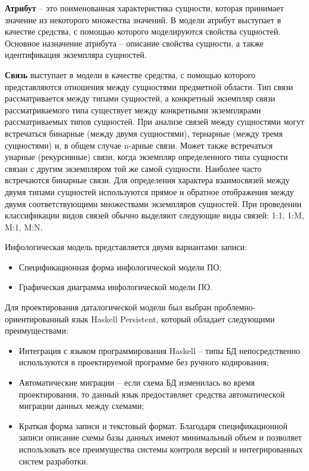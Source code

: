 \textbf{Атрибут} -- это поименованная характеристика сущности, которая принимает значение из некоторого множества значений. В модели атрибут выступает в качестве средства, с помощью которого моделируются свойства сущностей. Основное назначение атрибута – описание свойства сущности, а также идентификация экземпляра сущностей.

\textbf{Связь} выступает в модели в качестве средства, с помощью которого представляются отношения между сущностями предметной области. Тип связи рассматривается между типами сущностей, а конкретный экземпляр связи рассматриваемого типа существует между конкретными экземплярами рассматриваемых типов сущностей. При анализе связей между сущностями могут встречаться бинарные (между двумя сущностями), тернарные (между тремя сущностями) и, в общем случае n-арные связи. Может также встречаться унарные (рекурсивные) связи, когда экземпляр определенного типа сущности связан с другим экземпляром той же самой сущности. Наиболее часто встречаются бинарные связи. Для определения характера взаимосвязей между двумя типами сущностей используются прямое и обратное отображения между двумя соответствующими множествами экземпляров сущностей. При проведении классификации видов связей обычно выделяют следующие виды связей: 1:1, 1:M, M:1, M:N.

Инфологическая модель представляется двумя вариантами записи:
\begin{itemize}
\item Спецификационная форма инфологической модели ПО;
\item Графическая диаграмма инфологической модели ПО.
\end{itemize}

Для проектирования даталогической модели был выбран проблемно-ориентированный язык Haskell Persistent, который обладает следующими преимуществами:
\begin{itemize}
\item Интеграция с языком программирования Haskell -- типы БД непосредственно используются в проектируемой программе без ручного кодирования;
\item Автоматические миграции -- если схема БД изменилась во время проектирования, то данный язык предоставляет средства автоматической миграции данных между схемами;
\item Краткая форма записи и текстовый формат. Благодаря спецификационной записи описание схемы базы данных имеют минимальный объем и позволяет использовать все преимущества системы контроля версий и интегрированных систем разработки.
\end{itemize}

